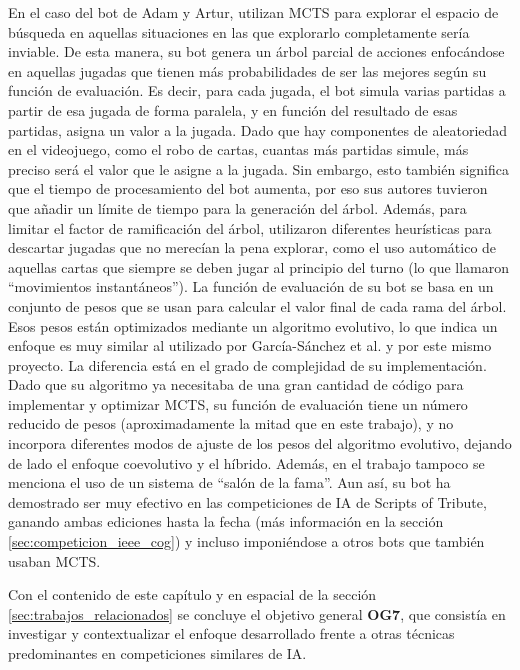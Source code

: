 En el caso del bot de Adam y Artur, utilizan MCTS para explorar el espacio de búsqueda en aquellas situaciones en las que explorarlo completamente sería inviable. De esta manera, su bot genera un árbol parcial de acciones enfocándose en aquellas jugadas que tienen más probabilidades de ser las mejores según su función de evaluación. Es decir, para cada jugada, el bot simula varias partidas a partir de esa jugada de forma paralela, y en función del resultado de esas partidas, asigna un valor a la jugada. Dado que hay componentes de aleatoriedad en el videojuego, como el robo de cartas, cuantas más partidas simule, más preciso será el valor que le asigne a la jugada. Sin embargo, esto también significa que el tiempo de procesamiento del bot aumenta, por eso sus autores tuvieron que añadir un límite de tiempo para la generación del árbol. Además, para limitar el factor de ramificación del árbol, utilizaron diferentes heurísticas para descartar jugadas que no merecían la pena explorar, como el uso automático de aquellas cartas que siempre se deben jugar al principio del turno (lo que llamaron ``movimientos instantáneos''). La función de evaluación de su bot se basa en un conjunto de pesos que se usan para calcular el valor final de cada rama del árbol. Esos pesos están optimizados mediante un algoritmo evolutivo, lo que indica un enfoque es muy similar al utilizado por García-Sánchez et al. y por este mismo proyecto. La diferencia está en el grado de complejidad de su implementación. Dado que su algoritmo ya necesitaba de una gran cantidad de código para implementar y optimizar MCTS, su función de evaluación tiene un número reducido de pesos (aproximadamente la mitad que en este trabajo), y no incorpora diferentes modos de ajuste de los pesos del algoritmo evolutivo, dejando de lado el enfoque coevolutivo y el híbrido. Además, en el trabajo tampoco se menciona el uso de un sistema de ``salón de la fama''. Aun así, su bot ha demostrado ser muy efectivo en las competiciones de IA de Scripts of Tribute, ganando ambas ediciones hasta la fecha (más información en la sección \ref{sec:competicion_ieee_cog}) y incluso imponiéndose a otros bots que también usaban MCTS.

Con el contenido de este capítulo y en espacial de la sección \ref{sec:trabajos_relacionados} se concluye el objetivo general \textbf{OG7}, que consistía en investigar y contextualizar el enfoque desarrollado frente a otras técnicas predominantes en competiciones similares de IA.